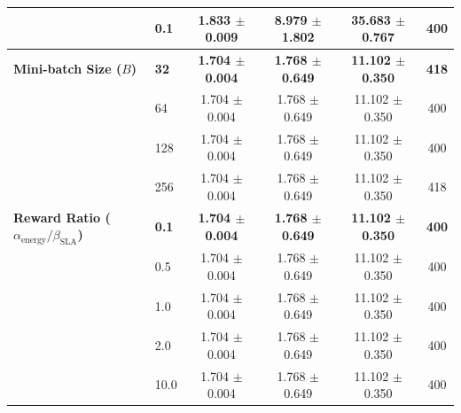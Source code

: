 \begin{table}[t]
{\begin{tabular}{llcccc}
 & 0.1 & 1.833 $\pm$ 0.009 & 8.979 $\pm$ 1.802 & 35.683 $\pm$ 0.767 & 400 \\
\midrule
\textbf{Mini-batch Size ($B$)} & \textbf{32} & \textbf{1.704 $\pm$ 0.004} & \textbf{1.768 $\pm$ 0.649} & \textbf{11.102 $\pm$ 0.350} & \textbf{418} \\
 & 64 & 1.704 $\pm$ 0.004 & 1.768 $\pm$ 0.649 & 11.102 $\pm$ 0.350 & 400 \\
 & 128 & 1.704 $\pm$ 0.004 & 1.768 $\pm$ 0.649 & 11.102 $\pm$ 0.350 & 400 \\
 & 256 & 1.704 $\pm$ 0.004 & 1.768 $\pm$ 0.649 & 11.102 $\pm$ 0.350 & 418 \\
\midrule
\textbf{Reward Ratio ($\alpha_{\text{energy}} / \beta_{\text{SLA}}$)} & \textbf{0.1} & \textbf{1.704 $\pm$ 0.004} & \textbf{1.768 $\pm$ 0.649} & \textbf{11.102 $\pm$ 0.350} & \textbf{400} \\
 & 0.5 & 1.704 $\pm$ 0.004 & 1.768 $\pm$ 0.649 & 11.102 $\pm$ 0.350 & 400 \\
 & 1.0 & 1.704 $\pm$ 0.004 & 1.768 $\pm$ 0.649 & 11.102 $\pm$ 0.350 & 400 \\
 & 2.0 & 1.704 $\pm$ 0.004 & 1.768 $\pm$ 0.649 & 11.102 $\pm$ 0.350 & 400 \\
 & 10.0 & 1.704 $\pm$ 0.004 & 1.768 $\pm$ 0.649 & 11.102 $\pm$ 0.350 & 400 \\
\bottomrule
\end{tabular}%
}
\end{table}
